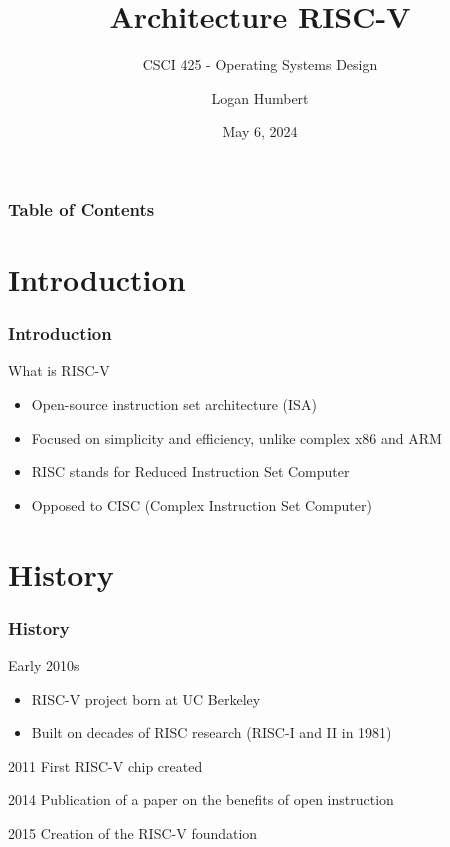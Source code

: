 \documentclass{beamer}
\title{Architecture RISC-V}
\subtitle{CSCI 425 - Operating Systems Design}
\author{Logan Humbert}
\institute{Colorado Mesa University}
\date{May 6, 2024}
\begin{document}
	\frame{\titlepage}
	
	\begin{frame}
		\frametitle{Table of Contents}
		\tableofcontents
	\end{frame}
	
	\section{Introduction}
	\begin{frame}
		\frametitle{Introduction}
		
		\begin{alertblock}{What is RISC-V}
			\begin{itemize}
				\item Open-source instruction set architecture (ISA)
				\item Focused on simplicity and efficiency, unlike complex x86 and ARM
				\item RISC stands for Reduced Instruction Set Computer
				\item Opposed to CISC (Complex Instruction Set Computer)
			\end{itemize}
		\end{alertblock}
	\end{frame}
	
	\section{History}
	\begin{frame}
		\frametitle{History}
		
		\begin{alertblock}{Early 2010s}
			\begin{itemize}
				\item RISC-V project born at UC Berkeley
				\item Built on decades of RISC research (RISC-I and II in 1981)
			\end{itemize}
		\end{alertblock}
		
		\begin{alertblock}{2011}
			First RISC-V chip created
		\end{alertblock}
		
		\begin{alertblock}{2014}
			Publication of a paper on the benefits of open instruction
		\end{alertblock}
		
		\begin{alertblock}{2015}
			Creation of the RISC-V foundation
		\end{alertblock}
	\end{frame}
	
\end{document}

